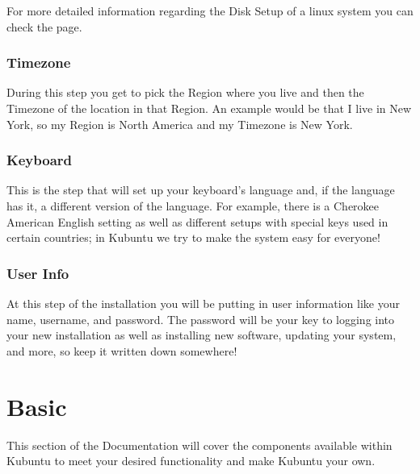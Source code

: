 \documentclass[letterpaper,10pt,english]{sphinxmanual}
\begin{document}
For more detailed information regarding the Disk Setup of a linux system you can check the  page.


\subsection{Timezone}
\label{\detokenize{docs/installation:timezone}}
During this step you get to pick the Region where you live and then the Timezone of the location in that Region. An example would be that I live in New York, so my Region is North America and my Timezone is New York.



\subsection{Keyboard}
\label{\detokenize{docs/installation:keyboard}}
This is the step that will set up your keyboard's language and, if the language has it, a different version of the language. For example, there is a Cherokee American English setting as well as different setups with special keys used in certain countries; in Kubuntu we try to make the system easy for everyone!



\subsection{User Info}
\label{\detokenize{docs/installation:user-info}}
At this step of the installation you will be putting in user information like your name, username, and password. The password will be your key to logging into your new installation as well as installing new software, updating your system, and more, so keep it written down somewhere!



\chapter{Basic}
\label{\detokenize{docs/basic::doc}}\label{\detokenize{docs/basic:basic-link}}\label{\detokenize{docs/basic:basic}}
This section of the Documentation will cover the components available within Kubuntu to meet your desired functionality and make Kubuntu your own.
\end{document}
